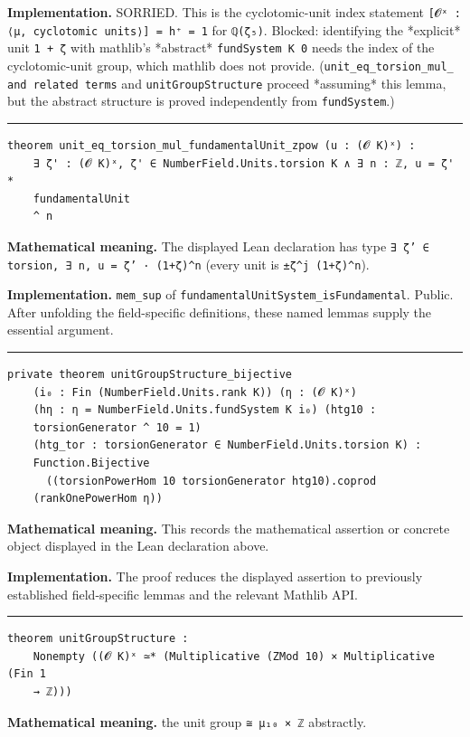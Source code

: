 \documentclass[UTF8,a4paper,11pt,fontset=fandol]{ctexart}
\theoremstyle{definition}
\newcommand{\statementsep}{\par\medskip\hrule\medskip}
\begin{document}
\noindent\textbf{Implementation.} SORRIED. This is the cyclotomic-unit index statement \texttt{[𝓞ˣ : ⟨μ, cyclotomic units⟩] = h⁺ = 1} for \texttt{ℚ(ζ₅)}. Blocked: identifying the *explicit* unit \texttt{1 + ζ} with mathlib's *abstract* \texttt{fundSystem K 0} needs the index of the cyclotomic-unit group, which mathlib does not provide. (\texttt{unit\_\allowbreak{}eq\_\allowbreak{}torsion\_\allowbreak{}mul\_\allowbreak{} and related terms} and \texttt{unitGroupStructure} proceed *assuming* this lemma, but the abstract structure is proved independently from \texttt{fundSystem}.)\par
\statementsep
\begin{verbatim}
theorem unit_eq_torsion_mul_fundamentalUnit_zpow (u : (𝓞 K)ˣ) :
    ∃ ζ' : (𝓞 K)ˣ, ζ' ∈ NumberField.Units.torsion K ∧ ∃ n : ℤ, u = ζ' *
    fundamentalUnit
    ^ n
\end{verbatim}
\noindent\textbf{Mathematical meaning.} The displayed Lean declaration has type \texttt{∃ ζ' ∈ torsion, ∃ n, u = ζ' · (1+ζ)\textasciicircum{}n} (every unit is \texttt{±ζ\textasciicircum{}j (1+ζ)\textasciicircum{}n}).\par
\noindent\textbf{Implementation.} \texttt{mem\_\allowbreak{}sup} of \texttt{fundamentalUnitSystem\_\allowbreak{}isFundamental}. Public. After unfolding the field-specific definitions, these named lemmas supply the essential argument.\par
\statementsep
\begin{verbatim}
private theorem unitGroupStructure_bijective
    (i₀ : Fin (NumberField.Units.rank K)) (η : (𝓞 K)ˣ)
    (hη : η = NumberField.Units.fundSystem K i₀) (htg10 :
    torsionGenerator ^ 10 = 1)
    (htg_tor : torsionGenerator ∈ NumberField.Units.torsion K) :
    Function.Bijective
      ((torsionPowerHom 10 torsionGenerator htg10).coprod
    (rankOnePowerHom η))
\end{verbatim}
\noindent\textbf{Mathematical meaning.} This records the mathematical assertion or concrete object displayed in the Lean declaration above.\par
\noindent\textbf{Implementation.} The proof reduces the displayed assertion to previously established field-specific lemmas and the relevant Mathlib API.\par
\statementsep
\begin{verbatim}
theorem unitGroupStructure :
    Nonempty ((𝓞 K)ˣ ≃* (Multiplicative (ZMod 10) × Multiplicative (Fin 1
    → ℤ)))
\end{verbatim}
\noindent\textbf{Mathematical meaning.} the unit group \texttt{≅ μ₁₀ × ℤ} abstractly.\par
\end{document}
